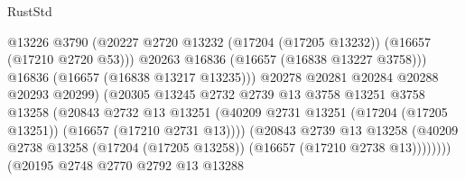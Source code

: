 \begin{lexlean}{RustStd}
\begin{coremodule}
                                            @13226
                                            @3790
                                            (@20227
                                              @2720
                                              @13232
                                              (@17204 (@17205 @13232))
                                              (@16657 (@17210 @2720 @53)))
                                            @20263
                                            @16836
                                            (@16657 (@16838 @13227 @3758)))
                                          @16836
                                          (@16657 (@16838 @13217 @13235)))
                                        @20278
                                        @20281
                                        @20284
                                        @20288
                                        @20293
                                        @20299)
                                      (@20305
                                        @13245
                                        @2732
                                        @2739
                                        @13
                                        @3758
                                        @13251
                                        @3758
                                        @13258
                                        (@20843
                                          @2732
                                          @13
                                          @13251
                                          (@40209
                                            @2731
                                            @13251
                                            (@17204 (@17205 @13251))
                                            (@16657 (@17210 @2731 @13))))
                                        (@20843
                                          @2739
                                          @13
                                          @13258
                                          (@40209
                                            @2738
                                            @13258
                                            (@17204 (@17205 @13258))
                                            (@16657 (@17210 @2738 @13))))))))
                                (@20195
                                  @2748
                                  @2770
                                  @2792
                                  @13
                                  @13288

\end{coremodule}
\end{lexlean}
